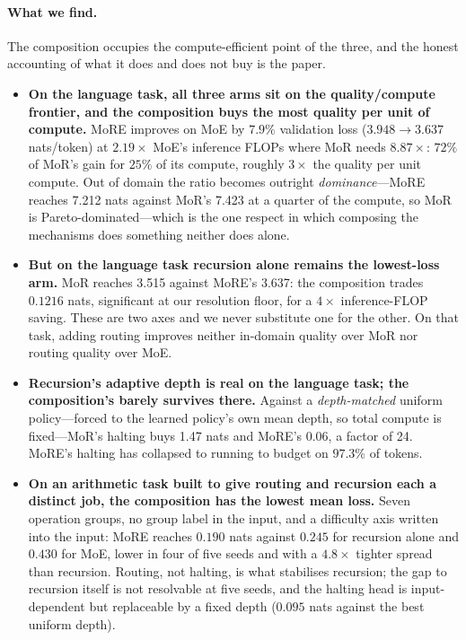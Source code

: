 \paragraph{What we find.} The composition occupies the compute-efficient point of
the three, and the honest accounting of what it does and does not buy is the
paper.

\begin{itemize}[leftmargin=1.4em,itemsep=1.5pt,topsep=2pt]
\item \textbf{On the language task, all three arms sit on the quality/compute
  frontier, and the composition buys the most quality per unit of compute.} MoRE
  improves on MoE by
  $7.9\%$ validation loss ($3.948 \rightarrow 3.637$ nats/token) at $2.19\times$
  MoE's inference FLOPs where MoR needs $8.87\times$: $72\%$ of MoR's gain for
  $25\%$ of its compute, roughly $3\times$ the quality per unit compute. Out of
  domain \citep{gao2020pile} the ratio becomes outright \emph{dominance}---MoRE
  reaches 7.212 nats against MoR's 7.423 at a quarter of the compute, so MoR is
  Pareto-dominated---which is the one respect in which composing the mechanisms
  does something neither does alone.

\item \textbf{But on the language task recursion alone remains the lowest-loss
  arm.} MoR reaches 3.515 against MoRE's 3.637: the composition trades $0.1216$
  nats, significant at our resolution floor, for a $4\times$ inference-FLOP
  saving. These are two axes and we never substitute one for the other. On that
  task, adding routing improves neither in-domain quality over MoR nor routing
  quality over MoE.

\item \textbf{Recursion's adaptive depth is real on the language task; the
  composition's barely survives there.} Against a \emph{depth-matched} uniform
  policy---forced to the learned policy's own mean depth, so total compute is
  fixed---MoR's halting buys 1.47 nats and MoRE's 0.06, a factor of 24. MoRE's
  halting has collapsed to running to budget on $97.3\%$ of tokens.

\item \textbf{On an arithmetic task built to give routing and recursion each a
  distinct job, the composition has the lowest mean loss.} Seven operation
  groups, no group label in the input, and a difficulty axis written into the
  input: MoRE reaches $0.190$ nats against $0.245$ for recursion alone and
  $0.430$ for MoE, lower in four of five seeds and with a $4.8\times$ tighter
  spread than recursion. Routing, not halting, is what stabilises recursion; the
  gap to recursion itself is not resolvable at five seeds, and the halting head
  is input-dependent but replaceable by a fixed depth ($0.095$ nats against the
  best uniform depth).


\end{itemize}
